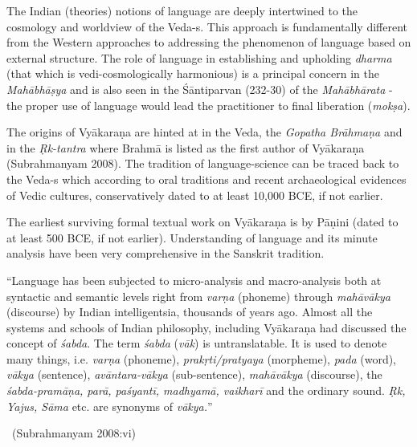 \vskip -6pt

The Indian (theories) notions of language are deeply intertwined to the cosmology and worldview of the Veda-s. This approach is fundamentally different from the Western approaches to addressing the phenomenon of language based on external structure. The role of language in establishing and upholding \textit{dharma} (that which is vedi-cosmologically harmonious) is a principal concern in the \textit{Mahābhāṣya} and is also seen in the Śāntiparvan (232-30) of the \textit{Mahābhārata} - the proper use of language would lead the practitioner to final liberation (\textit{mokṣa}).

The origins of Vyākaraṇa are hinted at in the Veda, the \textit{Gopatha Brāhmaṇa} and in the \textit{Ṛk-tantra} where Brahmā is listed as the first author of Vyākaraṇa (Subrahmanyam 2008). The tradition of language-science can be traced back to the Veda-s which according to oral traditions and recent archaeological evidences of Vedic cultures, conservatively dated to at least 10,000 BCE, if not earlier.

The earliest surviving formal textual work on Vyākaraṇa is by Pāṇini (dated to at least 500 BCE, if not earlier). Understanding of language and its minute analysis have been very comprehensive in the Sanskrit tradition.

\begin{myquote}
“Language has been subjected to micro-analysis and macro-analysis both at syntactic and semantic levels right from \textit{varṇa} (phoneme) through \textit{mahāvākya} (discourse) by Indian intelligentsia, thousands of years ago. Almost all the systems and schools of Indian philosophy, including Vyākaraṇa had discussed the concept of \textit{śabda}. The term \textit{śabda} (\textit{vāk}) is untranslatable. It is used to denote many things, i.e. \textit{varṇa} (phoneme), \textit{prakṛti/pratyaya} (morpheme), \textit{pada} (word), \textit{vākya} (sentence), \textit{avāntara-vākya} (sub-sentence), \textit{mahāvākya} (discourse), the \textit{śabda-pramāṇa, parā, paśyantī, madhyamā, vaikharī} and the ordinary sound. \textit{Ṛk, Yajus, Sāma} etc. are synonyms of \textit{vākya.}”

~\hfill (Subrahmanyam 2008:vi)
\end{myquote}


